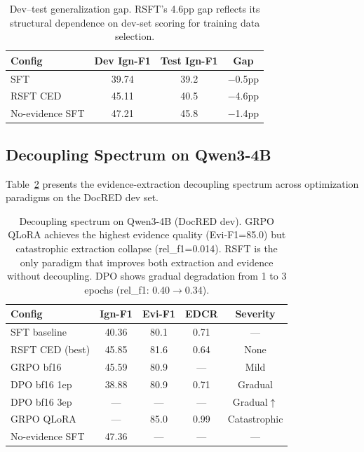 \documentclass[11pt,a4paper]{article}
\newcommand{\ced}{CED}
\begin{document}
\begin{table}[t]
\centering
\small
\begin{tabular}{lccc}
\toprule
\textbf{Config} & \textbf{Dev Ign-F1} & \textbf{Test Ign-F1} & \textbf{Gap} \\
\midrule
SFT & 39.74 & 39.2 & $-$0.5pp \\
RSFT \ced{} & 45.11 & 40.5 & $-$4.6pp \\
No-evidence SFT & 47.21 & 45.8 & $-$1.4pp \\
\bottomrule
\end{tabular}
\caption{Dev--test generalization gap. RSFT's 4.6pp gap reflects its structural dependence on dev-set scoring for training data selection.}
\label{tab:dev_test_gap}
\end{table}

\subsection{Decoupling Spectrum on Qwen3-4B}
\label{sec:decoupling}

Table~\ref{tab:decoupling} presents the evidence-extraction decoupling spectrum across optimization paradigms on the DocRED dev set.

\begin{table}[t]
\centering
\small
\begin{tabular}{lcccc}
\toprule
\textbf{Config} & \textbf{Ign-F1} & \textbf{Evi-F1} & \textbf{EDCR} & \textbf{Severity} \\
\midrule
SFT baseline & 40.36 & 80.1 & 0.71 & --- \\
RSFT \ced{} (best) & 45.85 & 81.6 & 0.64 & None \\
GRPO bf16 & 45.59 & 80.9 & --- & Mild \\
DPO bf16 1ep & 38.88 & 80.9 & 0.71 & Gradual \\
DPO bf16 3ep & --- & --- & --- & Gradual$\uparrow$ \\
GRPO QLoRA & --- & 85.0 & 0.99 & Catastrophic \\
\midrule
No-evidence SFT & 47.36 & --- & --- & --- \\
\bottomrule
\end{tabular}
\caption{Decoupling spectrum on Qwen3-4B (DocRED dev). GRPO QLoRA achieves the highest evidence quality (Evi-F1=85.0) but catastrophic extraction collapse (rel\_f1=0.014). RSFT is the only paradigm that improves both extraction and evidence without decoupling. DPO shows gradual degradation from 1 to 3 epochs (rel\_f1: 0.40$\to$0.34).}
\label{tab:decoupling}
\end{table}
\end{document}
